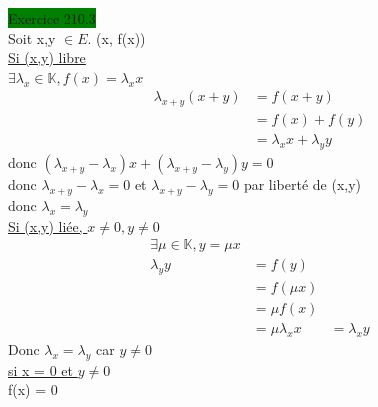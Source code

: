 \documentclass{article}
\begin{document}
\noindent \colorbox{green}{Exercice 210.3}\\
\noindent
Soit x,y \(\in E\). (x, f(x))\\
\underline{Si (x,y) libre}\\
\(\exists \lambda_x \in \mathbb{K}, f(x) = \lambda_x x\)
\begin{align*}
    \lambda_{x+y}(x+y) &= f(x+y)\\
    &= f(x) + f(y)\\
    &= \lambda_x x + \lambda_y y
\end{align*}
donc \((\lambda_{x+y} - \lambda_x)x + (\lambda_{x+y}-\lambda_y)y = 0\)\\
donc \(\lambda_{x+y} - \lambda_x = 0\) et \(\lambda_{x+y} - \lambda_y = 0\) 
par liberté de (x,y)\\
donc \(\lambda_x = \lambda_y\)\\
\underline{Si (x,y) liée, \(x \neq 0, y \neq 0\)}
\begin{align*}
    \exists \mu \in \mathbb{K}, y = \mu x\\
    \lambda_y y &= f(y)\\
    &= f(\mu x)\\
    &= \mu f(x)\\
    &= \mu \lambda_x x 
    &= \lambda_x y
\end{align*}
Donc \(\lambda_x = \lambda_y\) car \(y \neq 0\)\\
\underline{si x = 0 et \(y \neq 0\)}\\
f(x) = 0\\
\end{document}
